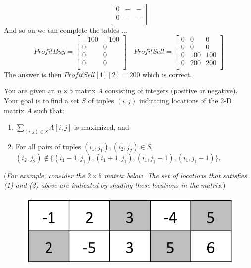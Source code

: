 \documentclass[answers]{exam}
\begin{document}
\begin{questions}
\begin{solution}
\[\begin{bmatrix}
    0 & - & -\\
    0 & - & - \\
    \end{bmatrix}
\]
And so on we can complete the tables ...
\[
    ProfitBuy =
    \begin{bmatrix}
    -100 & -100 \\
    0 & 0 \\
    0 & 0 \\
    0 & 0 \\
    \end{bmatrix} \quad
    ProfitSell =
    \begin{bmatrix}
    0 & 0 & 0 \\
    0 & 0 & 0 \\
    0 & 100 & 100\\
    0 & 200 & 200 \\
    \end{bmatrix}
\]
The answer is then $ProfitSell[4][2] = 200$ which is correct.

\end{solution}






\question[20] You are given an $n \times 5$ matrix $A$ consisting of integers (positive or negative). 
Your goal is to find a set $S$ of tuples $(i, j)$ indicating locations of the 2-D matrix $A$ such that:
\begin{enumerate}
\item $\sum_{(i, j) \in S} A[i, j]$ is maximized, and
\item For all pairs of tuples $(i_1, j_1), (i_2, j_2) \in S$, $(i_2, j_2) \notin \{(i_1-1, j_1), (i_1+1, j_1), (i_1, j_1-1), (i_1, j_1+1)\}$.
\end{enumerate}

({\it For example, consider the $2 \times 5$ matrix below. The set of locations that satisfies (1) and (2) above are indicated by shading these locations in the matrix.})

\begin{figure}[h]
\centering
\includegraphics[scale=0.2]{embed/array}
\end{figure}


\end{questions}
\end{document}
